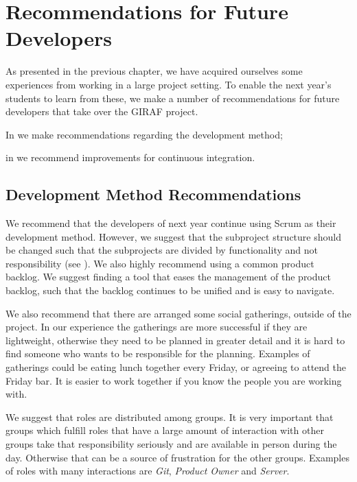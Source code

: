 \chapter{Recommendations for Future Developers}\label{chap:future_dev_recommendations}
As presented in the previous chapter, we have acquired ourselves some experiences from working in a large project setting. To enable the next year's students to learn from these, we make a number of recommendations for future developers that take over the GIRAF project.

\begin{chapterorganization}
  \item In  we make recommendations regarding the development method;
  \item in  we recommend improvements for continuous integration.
\end{chapterorganization}

\section{Development Method Recommendations}\label{sec:dev_recommentations}
We recommend that the developers of next year continue using Scrum as their development method. However, we suggest that the subproject structure should be changed such that the subprojects are divided by functionality and not responsibility (see ). We also highly recommend using a common product backlog. We suggest finding a tool that eases the management of the product backlog, such that the backlog continues to be unified and is easy to navigate.

We also recommend that there are arranged some social gatherings, outside of the project. In our experience the gatherings are more successful if they are lightweight, otherwise they need to be planned in greater detail and it is hard to find someone who wants to be responsible for the planning. Examples of gatherings could be eating lunch together every Friday, or agreeing to attend the Friday bar. It is easier to work together if you know the people you are working with.

We suggest that roles are distributed among groups. It is very important that groups which fulfill roles that have a large amount of interaction with other groups take that responsibility seriously and are available in person during the day. Otherwise that can be a source of frustration for the other groups. Examples of roles with many interactions are \emph{Git}, \emph{Product Owner} and \emph{Server}.

